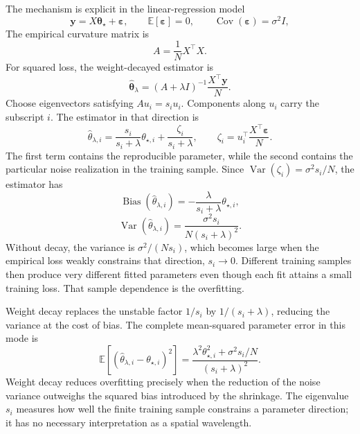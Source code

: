 \documentclass[11pt,letterpaper]{article}
\newcommand{\thet}{\bm{\theta}}
\begin{document}
The mechanism is explicit in the linear-regression model
\begin{equation}
  \bm y=X\thet_\star+\bm\varepsilon,
  \qquad
  \mathbb E[\bm\varepsilon]=0,
  \qquad
  \operatorname{Cov}(\bm\varepsilon)=\sigma^2I,
\end{equation}
The empirical curvature matrix is
\begin{equation}
  A=\frac1N X^\top X.
\end{equation}
For squared loss, the weight-decayed estimator is
\begin{equation}
  \widehat{\thet}_\lambda
  =(A+\lambda I)^{-1}\frac{X^\top\bm y}{N}.
\end{equation}
Choose eigenvectors satisfying \(Au_i=s_i u_i\). Components along \(u_i\)
carry the subscript \(i\). The estimator in that direction is
\begin{equation}\label{eq:ridge_mode_estimator}
  \widehat\theta_{\lambda,i}
  =\frac{s_i}{s_i+\lambda}\theta_{\star,i}
   +\frac{\zeta_i}{s_i+\lambda},
  \qquad
  \zeta_i=u_i^\top\frac{X^\top\bm\varepsilon}{N}.
\end{equation}
The first term contains the reproducible parameter, while the second contains
the particular noise realization in the training sample. Since
\(\operatorname{Var}(\zeta_i)=\sigma^2s_i/N\), the estimator has
\begin{equation}
  \operatorname{Bias}(\widehat\theta_{\lambda,i})
  =-\frac{\lambda}{s_i+\lambda}\theta_{\star,i},
\end{equation}
\begin{equation}\label{eq:ridge_mode_variance}
  \operatorname{Var}(\widehat\theta_{\lambda,i})
  =\frac{\sigma^2s_i}{N(s_i+\lambda)^2}.
\end{equation}
Without decay, the variance is \(\sigma^2/(Ns_i)\), which becomes large when
the empirical loss weakly constrains that direction, \(s_i\to0\). Different
training samples then produce very different fitted parameters even though
each fit attains a small training loss. That sample dependence is the
overfitting.

Weight decay replaces the unstable factor \(1/s_i\) by
\(1/(s_i+\lambda)\), reducing the variance at the cost of bias. The complete
mean-squared parameter error in this mode is
\begin{equation}\label{eq:ridge_bias_variance}
  \mathbb E\!\left[
    (\widehat\theta_{\lambda,i}-\theta_{\star,i})^2
  \right]
  =\frac{\lambda^2\theta_{\star,i}^2
          +\sigma^2s_i/N}
         {(s_i+\lambda)^2}.
\end{equation}
Weight decay reduces overfitting precisely when the reduction of the noise
variance outweighs the squared bias introduced by the shrinkage. The
eigenvalue \(s_i\) measures how well the finite training sample constrains a
parameter direction; it has no necessary interpretation as a spatial
wavelength.
\end{document}
